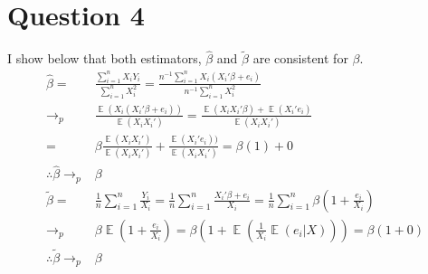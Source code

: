 \documentclass{article}
\renewcommand{\tilde}[1]{\widetilde{#1}}
\newcommand{\tb}{\tilde{\beta}}
\newcommand{\bhat}{\hat{\beta}}
\DeclareMathOperator{\E}{\mathbb{E}}%
\begin{document}

\section*{Question 4}
I show below that both estimators, $\bhat$ and $\tb$ are consistent for $\beta$.
\begin{align*}
			\bhat	= 	&\frac{\sum_{i=1}^nX_iY_i}{\sum_{i=1}^nX_i^2} = \frac{n^{-1}\sum_{i=1}^nX_i(X_i'\beta + e_i)}{n^{-1}\sum_{i=1}^nX_i^2}	\\
		\rightarrow_p	&\frac{\E(X_i(X_i'\beta + e_i))}{\E(X_iX_i')} = \frac{\E(X_iX_i'\beta) + \E(X_i'e_i)}{\E(X_iX_i')} \\
					= 	&\beta\frac{\E(X_iX_i')}{\E(X_iX_i')}+\frac{\E(X_i'e_i))}{\E(X_iX_i')} = \beta(1) + 0	\\
\therefore	\bhat\rightarrow_p&\beta																					\\
			\tb		=	&\frac{1}{n}\sum_{i=1}^n\frac{Y_i}{X_i} = \frac{1}{n}\sum_{i=1}^n\frac{X_i'\beta + e_i}{X_i} = \frac{1}{n}\sum_{i=1}^n\beta\left(1+\frac{e_i}{X_i}\right)	\\
		\rightarrow_p	&\beta\E\left(1+\frac{e_i}{X_i}\right) = \beta\left(1+\E\left(\frac{1}{X_i}\E(e_i|X)\right)\right) = \beta(1+0)	\\
\therefore	\tb\rightarrow_p&\beta																			
\end{align*}



\end{document}

